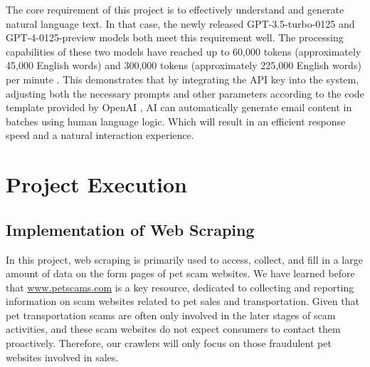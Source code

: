 \documentclass[ oneside,%
                    author={Cassie Qing Tang},
                    degree={BSc},
                     title={An Automated Response System for Disrupting Online Pet Scamming \\ },
                    subtitle={ }]{dissertation}
\begin{document}
The core requirement of this project is to effectively understand and generate natural language text. In that case, the newly released GPT-3.5-turbo-0125 and GPT-4-0125-preview models both meet this requirement well. The processing capabilities of these two models have reached up to 60,000 tokens (approximately 45,000 English words) and 300,000 tokens (approximately 225,000 English words) per minute \cite{noauthor_openai_nodate}. This demonstrates that by integrating the API key into the system, adjusting both the necessary prompts and other parameters according to the code template provided by OpenAI \cite{noauthor_openai_nodate}, AI can automatically generate email content in batches using human language logic. Which will result in an efficient response speed and a natural interaction experience.




\chapter{Project Execution}
\section{Implementation of Web Scraping}
In this project, web scraping is primarily used to access, collect, and fill in a large amount of data on the form pages of pet scam websites. We have learned before that \url{www.petscams.com} is a key resource, dedicated to collecting and reporting information on scam websites related to pet sales and transportation. Given that pet transportation scams are often only involved in the later stages of scam activities, and these scam websites do not expect consumers to contact them proactively. Therefore, our crawlers will only focus on those fraudulent pet websites involved in sales.
\end{document}
